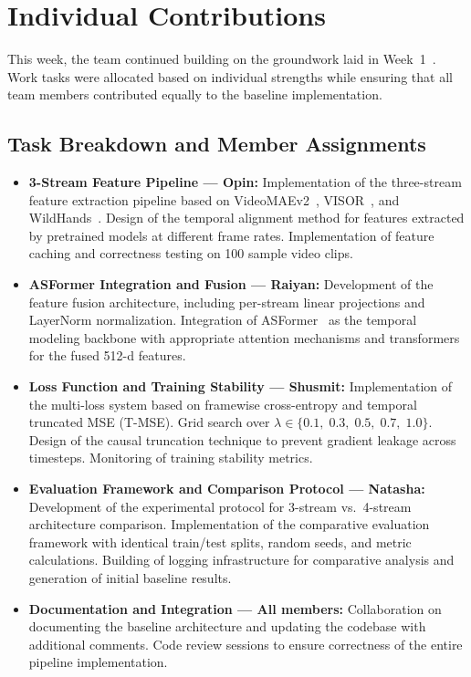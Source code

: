 \documentclass[11pt,a4paper]{article}
\begin{document}
\section{Individual Contributions}

This week, the team continued building on the groundwork laid in Week~1~\cite{week1}. Work tasks were allocated based on individual strengths while ensuring that all team members contributed equally to the baseline implementation.

\subsection{Task Breakdown and Member Assignments}

\begin{itemize}[nosep]
  \item \textbf{3-Stream Feature Pipeline --- Opin:} Implementation of the three-stream feature extraction pipeline based on VideoMAEv2~\cite{videoMAEv2}, VISOR~\cite{visor}, and WildHands~\cite{wildhands}. Design of the temporal alignment method for features extracted by pretrained models at different frame rates. Implementation of feature caching and correctness testing on 100 sample video clips.

  \item \textbf{ASFormer Integration and Fusion --- Raiyan:} Development of the feature fusion architecture, including per-stream linear projections and LayerNorm normalization. Integration of ASFormer~\cite{asformer} as the temporal modeling backbone with appropriate attention mechanisms and transformers for the fused 512-d features.

  \item \textbf{Loss Function and Training Stability --- Shusmit:} Implementation of the multi-loss system based on framewise cross-entropy and temporal truncated MSE (T-MSE). Grid search over $\lambda \in \{0.1,\; 0.3,\; 0.5,\; 0.7,\; 1.0\}$. Design of the causal truncation technique to prevent gradient leakage across timesteps. Monitoring of training stability metrics.

  \item \textbf{Evaluation Framework and Comparison Protocol --- Natasha:} Development of the experimental protocol for 3-stream vs.\ 4-stream architecture comparison. Implementation of the comparative evaluation framework with identical train/test splits, random seeds, and metric calculations. Building of logging infrastructure for comparative analysis and generation of initial baseline results.

  \item \textbf{Documentation and Integration --- All members:} Collaboration on documenting the baseline architecture and updating the codebase with additional comments. Code review sessions to ensure correctness of the entire pipeline implementation.
\end{itemize}
\end{document}
